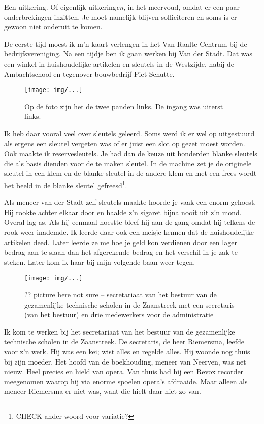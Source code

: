 \documentclass[10pt,twoside,openright]{memoir}
\begin{document}
Een uitkering. Of eigenlijk uitkering\emph{en}, in het meervoud, omdat er een paar onderbrekingen inzitten. Je moet namelijk blijven solliciteren en soms is er gewoon niet onderuit te komen. 

De eerste tijd moest ik m'n kaart verlengen in het Van Raalte Centrum bij de bedrijfsvereniging. Na een tijdje ben ik gaan werken bij Van der Stadt. Dat was een winkel in huishoudelijke artikelen en sleutels in de Westzijde, nabij de Ambachtschool en tegenover bouwbedrijf Piet Schutte.

\begin{figure}[t]
\texttt{[image: img/...]}
\caption{Op de foto zijn het de twee panden links. De ingang was uiterst links.}
\end{figure}

Ik heb daar vooral veel over sleutels geleerd. Soms werd ik er wel op uitgestuurd als ergens een sleutel vergeten was of er juist een slot op gezet moest worden. Ook maakte ik reservesleutels. Je had dan de keuze uit honderden blanke sleutels die als basis dienden voor de te maken sleutel. In de machine zet je de originele sleutel in een klem en de blanke sleutel in de andere klem en met een frees wordt het beeld in de blanke sleutel gefreesd\footnote{CHECK ander woord voor variatie?}. 

Als meneer van der Stadt zelf sleutels maakte hoorde je vaak een enorm gehoest. Hij rookte achter elkaar door en haalde z’n sigaret bijna nooit uit z’n mond. Overal lag as. Als hij eenmaal hoestte bleef hij aan de gang omdat hij telkens de rook weer inademde. Ik leerde daar ook een meisje kennen dat de huishoudelijke artikelen deed. Later leerde ze me hoe je geld kon verdienen door een lager bedrag aan te slaan dan het afgerekende bedrag en het verschil in je zak te steken. Later kom ik haar bij mijn volgende baan weer tegen. 

\begin{figure}[t]
\texttt{[image: img/...]}
\caption{?? picture here not sure -- secretariaat van het bestuur van de gezamenlijke technische scholen in de Zaanstreek met een secretaris (van het bestuur) en drie medewerkers voor de administratie}
\end{figure}

Ik kom te werken bij het secretariaat van het bestuur van de gezamenlijke technische scholen in de Zaanstreek. De secretaris, de heer Riemersma, leefde voor z'n werk. Hij was een kei; wist alles en regelde alles. Hij woonde nog thuis bij zijn moeder. Het hoofd van de boekhouding, meneer van Neerven, was net nieuw. Heel precies en hield van opera. Van thuis had hij een Revox recorder meegenomen waarop hij via enorme spoelen opera's afdraaide. Maar alleen als meneer Riemersma er niet was, want die hielt daar niet zo van.
\end{document}
